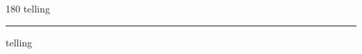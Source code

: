 
\begin{frame}
\begin{center}
\begin{turn}{180}
{\fontsize{2.5cm}{1em}\selectfont telling}
\end{turn}
\vspace{1em}\par  
\hrule
\vspace{1em}\par  
{\fontsize{2.5cm}{1em}\selectfont telling}
\end{center}
\end{frame}
